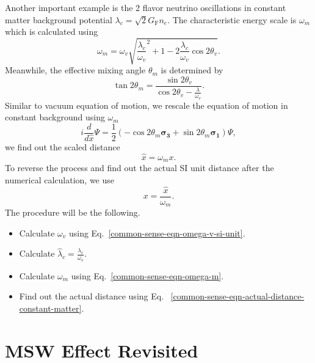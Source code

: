 Another important example is the 2 flavor neutrino oscillations in constant matter background potential $\lambda_c = \sqrt{2}G_{\mathrm F} n_e$. The characteristic energy scale is $\omega_m$ which is calculated using
\begin{equation}
   \omega_m = \omega_v \sqrt{ \frac{\lambda_c}{\omega_v}^2 + 1 - 2 \frac{\lambda_c}{\omega_v}\cos 2\theta_v }.
   \label{common-sense-eqn-omega-m}
\end{equation}
Meanwhile, the effective mixing angle $\theta_m$ is determined by
\begin{equation}
   \tan 2\theta_m = \frac{\sin 2\theta_v}{\cos 2\theta_v - \frac{\lambda}{\omega_v} }.
\end{equation}
Similar to vacuum equation of motion, we rescale the equation of motion in constant background using $\omega_m$
\begin{equation}
   i \frac{d}{d\hat x} \Psi = \frac{1}{2}(-\cos 2\theta_m \boldsymbol{\sigma_3} + \sin 2\theta_m \boldsymbol{\sigma_1})\Psi ,
\end{equation}
we find out the scaled distance
\begin{equation}
   \hat x = \omega_m x.
\end{equation}
To reverse the process and find out the actual SI unit distance after the numerical calculation, we use
\begin{equation}
   x = \frac{\hat x}{\omega_m}.
   \label{common-sense-eqn-actual-distance-constant-matter}
\end{equation}
The procedure will be the following.
\begin{itemize}
    \item Calculate $\omega_v$ using Eq.~\ref{common-sense-eqn-omega-v-si-unit}.
\item Calculate $\hat\lambda_c = \frac{\lambda_c}{\omega_v}$.
\item Calculate $\omega_m$ using Eq.~\ref{common-sense-eqn-omega-m}.
\item Find out the actual distance using Eq.~ \ref{common-sense-eqn-actual-distance-constant-matter}.
\end{itemize}







\chapter{\label{app:msw-revisited}MSW Effect Revisited}






